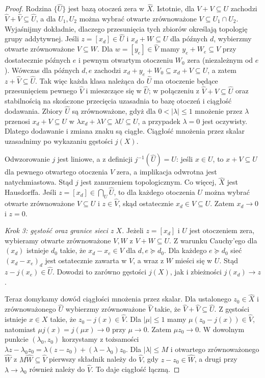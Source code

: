 \documentclass[11pt,a4paper]{article}
\numberwithin{equation}{section}
\theoremstyle{plain}
\theoremstyle{definition}
\theoremstyle{remark}
\begin{document}
\begin{proof}
Rodzina $\{\widehat U\}$ jest bazą otoczeń zera w
$\widehat X$. Istotnie, dla $V+V\subseteq U$ zachodzi
$\widehat V+\widehat V\subseteq\widehat U$,
a dla $U_1,U_2$ można wybrać otwarte zrównoważone
$V\subseteq U_1\cap U_2$. Wyjaśnijmy dokładnie, dlaczego przesunięcia tych zbiorów
określają topologię grupy addytywnej. Jeśli
$z=[x_d]\in\widehat U$ i $x_d+W\subseteq U$ dla późnych $d$,
wybierzmy otwarte zrównoważone $V\subseteq W$.
Dla $w=[y_e]\in\widehat V$ mamy
$y_e+W_e\subseteq V$ przy dostatecznie późnych $e$
i pewnym otwartym otoczeniu $W_0$ zera (niezależnym od $e$).
Wówczas dla późnych $d,e$ zachodzi
$x_d+y_e+W_0\subseteq x_d+V\subseteq U$,
a zatem $z+\widehat V\subseteq\widehat U$.
Tak więc każda klasa należąca do $\widehat U$ ma
otoczenie będące przesunięciem pewnego $\widehat V$
i mieszczące się w $\widehat U$; w połączeniu z
$\widehat V+\widehat V\subseteq\widehat U$ oraz
stabilnością na skończone przecięcia uzasadnia to
bazę otoczeń i ciągłość dodawania.
Zbiory $\widehat U$ są zrównoważone, gdyż dla
$0<|\lambda|\leq1$ mnożenie przez $\lambda$
przenosi $x_d+V\subseteq U$ w
$\lambda x_d+\lambda V\subseteq\lambda U\subseteq U$,
a przypadek $\lambda=0$ jest oczywisty.
Dlatego dodawanie i zmiana znaku są ciągłe. Ciągłość
mnożenia przez skalar uzasadnimy po wykazaniu gęstości $j(X)$.

Odwzorowanie $j$ jest liniowe, a z definicji
$j^{-1}(\widehat U)=U$: jeśli $x\in U$, to
$x+V\subseteq U$ dla pewnego otwartego otoczenia $V$ zera,
a implikacja odwrotna jest natychmiastowa.
Stąd $j$ jest zanurzeniem topologicznym. Co więcej,
$\widehat X$ jest Hausdorffa. Jeśli
$z=[x_d]\in\bigcap_U\widehat U$, to dla każdego otoczenia
$U$ można wybrać otwarte zrównoważone $V\subseteq U$
i $z\in\widehat V$, skąd ostatecznie $x_d\in V\subseteq U$.
Zatem $x_d\to0$ i $z=0$.

\emph{Krok 3: gęstość oraz granice sieci z $X$.}
Jeżeli $z=[x_d]$ i $U$ jest otoczeniem zera, wybieramy
otwarte zrównoważone $V,W$ z $V+W\subseteq U$.
Z warunku Cauchy'ego dla $(x_d)$ istnieje $d_0$ takie, że
$x_d-x_e\in V$ dla $d,e\succeq d_0$.
Dla każdego $e\succeq d_0$ sieć $(x_d-x_e)_d$ jest
ostatecznie zawarta w $V$, a wraz z $W$ mieści się w $U$.
Stąd $z-j(x_e)\in\widehat U$. Dowodzi to zarówno
gęstości $j(X)$, jak i zbieżności $j(x_d)\to z$.

Teraz domykamy dowód ciągłości mnożenia przez skalar.
Dla ustalonego $z_0\in\widehat X$ i zrównoważonego
$\widehat U$ wybierzmy zrównoważone $\widehat V$
takie, że $\widehat V+\widehat V\subseteq\widehat U$.
Z gęstości istnieje $x\in X$ takie, że
$z_0-j(x)\in\widehat V$. Dla $|\mu|\leq1$ mamy
$\mu(z_0-j(x))\in\widehat V$, natomiast
$\mu j(x)=j(\mu x)\to0$ przy $\mu\to0$.
Zatem $\mu z_0\to0$. W dowolnym punkcie
$(\lambda_0,z_0)$ korzystamy z tożsamości
$\lambda z-\lambda_0z_0=\lambda(z-z_0)+
(\lambda-\lambda_0)z_0$. Dla $|\lambda|\leq M$
i otwartego zrównoważonego $\widehat W$ z
$M\widehat W\subseteq\widehat V$ pierwszy składnik
należy do $\widehat V$, gdy $z-z_0\in\widehat W$,
a drugi przy $\lambda\to\lambda_0$ również należy
do $\widehat V$. To daje ciągłość łączną.


\end{proof}
\end{document}
